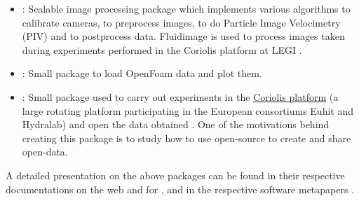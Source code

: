 \begin{itemize}
\item {}: Scalable image processing package which implements
various algorithms to calibrate cameras, to preprocess images, to do Particle
Image Velocimetry (PIV) and to postprocess data.
%
Fluidimage is used to process images taken during experiments performed in the
Coriolis platform at LEGI \cite[]{ISSF2016}.

\item {}: Small package to load OpenFoam data and plot them.

\item {}: Small package used to carry out experiments in the
\href{http://www.legi.grenoble-inp.fr/web/spip.php?article757}{Coriolis platform}
(a large rotating platform participating in the European consortiums Euhit and
Hydralab) and open the data obtained \cite[see, for example,][]{ISSF2016}. One of
the motivations behind creating this package is to study how to use open-source to
create and share open-data.

\end{itemize}

A detailed presentation on the above packages can be found in their respective
documentations on the web and for ,  and
 in the respective software metapapers
\citep[]{fluiddyn, fluidfft, fluidsim}. 


